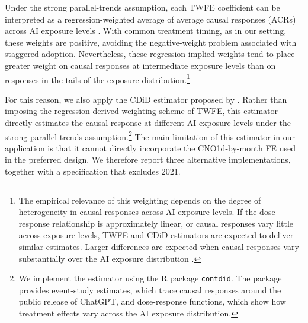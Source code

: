 \documentclass[11pt]{article}
\begin{document}
Under the strong parallel-trends assumption, each TWFE coefficient can be interpreted as a regression-weighted average of average causal responses (ACRs) across AI exposure levels \citep{callaway_goodmanbacon_santanna_2024}. With common treatment timing, as in our setting, these weights are positive, avoiding the negative-weight problem associated with staggered adoption. Nevertheless, these regression-implied weights tend to place greater weight on causal responses at intermediate exposure levels than on responses in the tails of the exposure distribution.\footnote{The empirical relevance of this weighting depends on the degree of heterogeneity in causal responses across AI exposure levels. If the dose-response relationship is approximately linear, or causal responses vary little across exposure levels, TWFE and CDiD estimators are expected to deliver similar estimates. Larger differences are expected when causal responses vary substantially over the AI exposure distribution \citep{callaway_goodmanbacon_santanna_2024}.}

For this reason, we also apply the CDiD estimator proposed by \citet{callaway_goodmanbacon_santanna_2024}. Rather than imposing the regression-derived weighting scheme of TWFE, this estimator directly estimates the causal response at different AI exposure levels under the strong parallel-trends assumption.\footnote{We implement the estimator using the R package \texttt{contdid}. The package provides event-study estimates, which trace causal responses around the public release of ChatGPT, and dose-response functions, which show how treatment effects vary across the AI exposure distribution.} The main limitation of this estimator in our application is that it cannot directly incorporate the CNO1d-by-month FE used in the preferred design. We therefore report three alternative implementations, together with a specification that excludes 2021.
\end{document}
